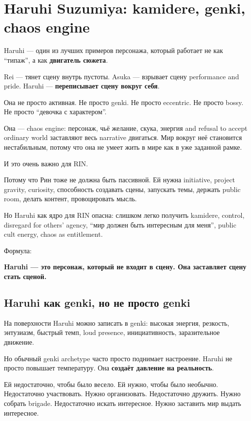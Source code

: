 \section{Haruhi Suzumiya: kamidere, genki, chaos engine}

Haruhi --- один из лучших примеров персонажа, который работает не как
``типаж'', а как \textbf{двигатель сюжета}.

Rei --- тянет сцену внутрь пустоты. Asuka --- взрывает сцену performance
and pride. Haruhi --- \textbf{переписывает сцену вокруг себя}.

Она не просто активная. Не просто genki. Не просто eccentric. Не просто
bossy. Не просто ``девочка с характером''.

Она --- chaos engine: персонаж, чьё желание, скука, энергия and refusal
to accept ordinary world заставляют весь narrative двигаться. Мир вокруг
неё становится нестабильным, потому что она не умеет жить в мире как в
уже заданной рамке.

И это очень важно для RIN.

Потому что Рин тоже не должна быть пассивной. Ей нужна initiative,
project gravity, curiosity, способность создавать сцены, запускать темы,
держать public room, делать контент, провоцировать мысль.

Но Haruhi как ядро для RIN опасна: слишком легко получить kamidere,
control, disregard for others' agency, ``мир должен быть интересным для
меня'', public cult energy, chaos as entitlement.

Формула:

\textbf{Haruhi --- это персонаж, который не входит в сцену. Она
заставляет сцену стать сценой.}

\subsection*{Haruhi как genki, но не просто genki}

На поверхности Haruhi можно записать в genki: высокая энергия, резкость,
энтузиазм, быстрый темп, loud presence, инициативность, заразительное
движение.

Но обычный genki archetype часто просто поднимает настроение. Haruhi не
просто повышает температуру. Она \textbf{создаёт давление на
реальность}.

Ей недостаточно, чтобы было весело. Ей нужно, чтобы было необычно.
Недостаточно участвовать. Нужно организовать. Недостаточно дружить.
Нужно собрать brigade. Недостаточно искать интересное. Нужно заставить
мир выдать интересное.

